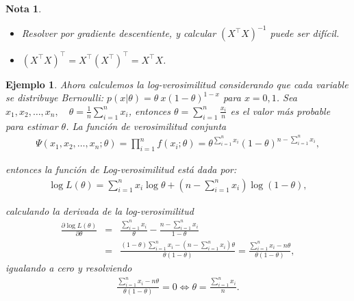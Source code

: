 \documentclass[12pt]{article}
\newtheorem{Note}{Nota}%
\newtheorem{Ejem}{Ejemplo}%
\begin{document}
\begin{Note}
\begin{itemize}
\item Resolver por gradiente descentiente, y calcular $ (X^{\top} X)^{-1}$ puede ser dif\'icil.
\item $(X^{\top} X)^{\top}=X^{\top}(X^{\top})^{\top}=X^{\top} X$.
\end{itemize}
\end{Note}

\begin{Ejem}
Ahora calculemos la log-verosimilitud considerando que cada variable se distribuye Bernoulli: $p\left(x|\theta\right)=\theta~{x}\left(1-\theta\right)^{1-x}$ para $x=0,1$.
Sea  $x_1, x_2, \dots, x_n, \quad \theta = \frac{1}{n} \sum_{i=1}^{n} x_i$, entonces $\theta=\sum_{i=1}^{n}\frac{x_{i}}{n}$ es el valor m\'as probable para estimar $\theta$. La función de verosimilitud conjunta
\begin{eqnarray}
\Psi(x_1, x_2, \dots, x_n; \theta) = \prod_{i=1}^{n} f(x_i; \theta)= \theta^{\sum_{i=1}^{n} x_i} (1 - \theta)^{n - \sum_{i=1}^{n} x_i},
\end{eqnarray}

entonces la funci\'on de  Log-verosimilitud est\'a dada por:
\begin{eqnarray}
\log L(\theta) = \sum_{i=1}^{n} x_i \log \theta + (n - \sum_{i=1}^{n} x_i) \log (1 - \theta),
\end{eqnarray}

calculando la derivada de la log-verosimilitud
\begin{eqnarray}
\frac{\partial \log L(\theta)}{\partial \theta} &=& \frac{\sum_{i=1}^{n} x_i}{\theta} - \frac{n - \sum_{i=1}^{n}x_i}{1 - \theta}\\
&=& \frac{(1 - \theta) \sum_{i=1}^{n} x_i - (n - \sum_{i=1}^{n} x_i) \theta}{\theta (1 - \theta)} = \frac{\sum_{i=1}^{n} x_i - n \theta}{\theta (1 - \theta)},
\end{eqnarray}
igualando a cero y resolviendo
\begin{eqnarray}
\frac{\sum_{i=1}^{n}x_i - n \theta}{\theta (1 - \theta)}=0\Leftrightarrow \theta =\frac{\sum_{i=1}^{n} x_{i}}{n}.
\end{eqnarray}
\end{Ejem}
\end{document}
